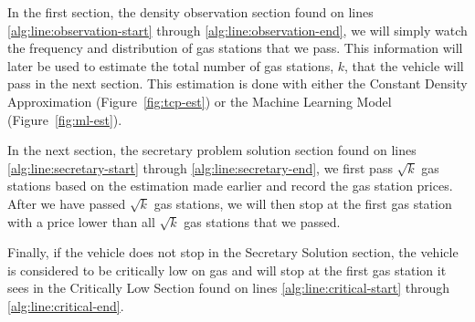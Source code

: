 In the first section, the density observation section found on lines \ref{alg:line:observation-start} through \ref{alg:line:observation-end}, we will simply watch the frequency and distribution of gas stations that we pass. This information will later be used to estimate the total number of gas stations, $k$, that the vehicle will pass in the next section. This estimation is done with either the Constant Density Approximation (Figure~\ref{fig:tcp-est}) or the Machine Learning Model (Figure~\ref{fig:ml-est}).

In the next section, the secretary problem solution section found on lines \ref{alg:line:secretary-start} through \ref{alg:line:secretary-end}, we first pass $\sqrt{k}$ gas stations based on the estimation made earlier and record the gas station prices. After we have passed $\sqrt{k}$ gas stations, we will then stop at the first gas station with a price lower than all $\sqrt{k}$ gas stations that we passed.

Finally, if the vehicle does not stop in the Secretary Solution section, the vehicle is considered to be critically low on gas and will stop at the first gas station it sees in the Critically Low Section found on lines \ref{alg:line:critical-start} through \ref{alg:line:critical-end}. 
